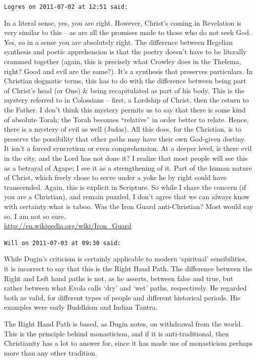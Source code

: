 \begin{footnotesize}
\begin{sffamily}
\hfill

\texttt{Logres on 2011-07-02 at 12:51 said:}

In a literal sense, yes, you are right. However, Christ's coming in Revelation is very similar to this -- as are all the promises made to those who do not seek God. Yes, so in a sense you are absolutely right. The difference between Hegelian synthesis and poetic apprehension is that the poetry doesn't have to be literally crammed together (again, this is precisely what Crowley does in the Thelema, right? Good and evil are the same?). It's a synthesis that preserves particulars. In Christian dogmatic terms, this has to do with the difference between being part of Christ's head (or One) \& being recapitulated as part of his body. This is the mystery referred to in Colossians -- first, a Lordship of Christ, then the return to the Father. I don't think this mystery permits us to say that there is some kind of absolute Torah; the Torah becomes ``relative'' in order better to relate. Hence, there is a mystery of evil as well (Judas). All this does, for the Christian, is to preserve the possibility that other paths may have their own God-given destiny. It isn't a forced syncretism or even comprehension. At a deeper level, is there evil in the city, and the Lord has not done it? I realize that most people will see this as a betrayal of Agape; I see it as a strengthening of it. Part of the human nature of Christ, which freely chose to serve under a yoke he by right could have transcended. Again, this is explicit in Scripture. So while I share the concern (if you are a Christian), and remain puzzled, I don't agree that we can always know with certainty what is taboo. Was the Iron Guard anti-Christian? Most would say so. I am not so sure.\\
\url{http://en.wikipedia.org/wiki/Iron_Guard}


\hfill

\texttt{Will on 2011-07-03 at 09:30 said:}

While Dugin's criticism is certainly applicable to modern `spiritual' sensibilities, it is incorrect to say that this is the Right Hand Path. The difference between the Right and Left hand paths is not, as he asserts, between false and true, but rather between what Evola calls `dry' and `wet' paths, respectively. He regarded both as valid, for different types of people and different historical periods. His examples were early Buddhism and Indian Tantra.

The Right Hand Path is based, as Dugin notes, on withdrawal from the world. This is the principle behind monasticism, and if it is anti-traditional, then Christianity has a lot to answer for, since it has made use of monasticism perhaps more than any other tradition.


\end{sffamily}
\end{footnotesize}
